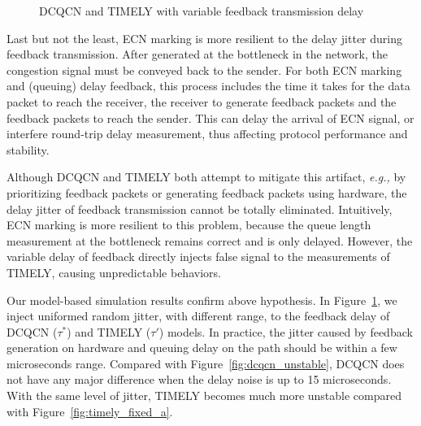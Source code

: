 \begin{figure}
\center
{}
\vspace{-1em}
\caption{DCQCN and TIMELY with variable feedback transmission delay}
\vspace{-1em}
\label{fig:variable_delay}
\end{figure}

Last but not the least, ECN marking is more resilient to the delay jitter during feedback 
transmission. After generated at the bottleneck in the network, the congestion signal must
be conveyed back to the sender. For both ECN marking and (queuing) delay feedback, this 
process includes the time it takes for the data packet to reach the receiver, the receiver
to generate feedback packets and the feedback packets to reach the sender. This can delay
the arrival of ECN signal, or interfere round-trip delay measurement, thus affecting
protocol performance and stability.

Although DCQCN and TIMELY both attempt to mitigate this artifact, {\em e.g.,} by prioritizing
feedback packets or generating feedback packets using hardware, the delay jitter of
feedback transmission cannot be totally eliminated. Intuitively, ECN marking is more
resilient to this problem, because the queue length measurement at the bottleneck remains
correct and is only delayed. However, the variable delay of feedback directly injects false signal
to the measurements of TIMELY, causing unpredictable behaviors.

Our model-based simulation results confirm above hypothesis. In Figure~\ref{fig:variable_delay}, we inject 
uniformed random jitter, with different range, to the feedback delay of DCQCN ($\tau^*$) 
and TIMELY ($\tau '$) models. In practice, the jitter caused by feedback generation on hardware 
and queuing delay on the path should be within a few microseconds range. Compared with 
Figure~\ref{fig:dcqcn_unstable}, DCQCN does not have any major difference when the delay noise is 
up to 15 microseconds. With the same level of jitter, TIMELY becomes much more unstable compared
with Figure~\ref{fig:timely_fixed_a}.


